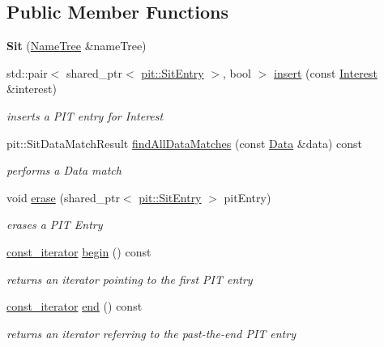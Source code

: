 \subsection*{Public Member Functions}
\begin{DoxyCompactItemize}
\item 
{\bfseries Sit} (\hyperlink{classnfd_1_1NameTree}{Name\+Tree} \&name\+Tree)\hypertarget{classnfd_1_1Sit_af6f70d0ddbd0512d4240f181c7e807cf}{}\label{classnfd_1_1Sit_af6f70d0ddbd0512d4240f181c7e807cf}

\item 
std\+::pair$<$ shared\+\_\+ptr$<$ \hyperlink{classnfd_1_1pit_1_1SitEntry}{pit\+::\+Sit\+Entry} $>$, bool $>$ \hyperlink{classnfd_1_1Sit_a7817c368b4e76b16b1e349e1aec9bd07}{insert} (const \hyperlink{classndn_1_1Interest}{Interest} \&interest)
\begin{DoxyCompactList}\small\item\em inserts a P\+IT entry for Interest \end{DoxyCompactList}\item 
pit\+::\+Sit\+Data\+Match\+Result \hyperlink{classnfd_1_1Sit_a359e5521f258501715d677276c5596d7}{find\+All\+Data\+Matches} (const \hyperlink{classndn_1_1Data}{Data} \&data) const
\begin{DoxyCompactList}\small\item\em performs a Data match \end{DoxyCompactList}\item 
void \hyperlink{classnfd_1_1Sit_acc3e1ae79cf7875071189c509d58a234}{erase} (shared\+\_\+ptr$<$ \hyperlink{classnfd_1_1pit_1_1SitEntry}{pit\+::\+Sit\+Entry} $>$ pit\+Entry)\hypertarget{classnfd_1_1Sit_acc3e1ae79cf7875071189c509d58a234}{}\label{classnfd_1_1Sit_acc3e1ae79cf7875071189c509d58a234}

\begin{DoxyCompactList}\small\item\em erases a P\+IT Entry \end{DoxyCompactList}\item 
\hyperlink{classnfd_1_1Sit_1_1const__iterator}{const\+\_\+iterator} \hyperlink{classnfd_1_1Sit_a0075b80cf091a7f6f54bc35bcfc10f88}{begin} () const
\begin{DoxyCompactList}\small\item\em returns an iterator pointing to the first P\+IT entry \end{DoxyCompactList}\item 
\hyperlink{classnfd_1_1Sit_1_1const__iterator}{const\+\_\+iterator} \hyperlink{classnfd_1_1Sit_a5d895950170cb8b3261c526a06a75266}{end} () const
\begin{DoxyCompactList}\small\item\em returns an iterator referring to the past-\/the-\/end P\+IT entry \end{DoxyCompactList}\end{DoxyCompactItemize}
